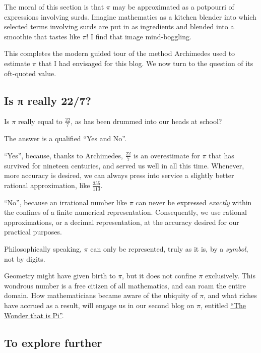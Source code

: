 \documentclass[
  a4paper,
]{article}
\begin{document}
The moral of this section is that \(\pi\) may be approximated as a
potpourri of expressions involving surds. Imagine mathematics as a
kitchen blender into which selected terms involving surds are put in as
ingredients and blended into a smoothie that tastes like \(\pi\)! I find
that image mind-boggling.

This completes the modern guided tour of the method Archimedes used to
estimate \(\pi\) that I had envisaged for this blog. We now turn to the
question of its oft-quoted value.

\subsection{Is π really 22/7?}\label{is-ux3c0-really-227}

Is \(\pi\) really equal to \(\frac{22}{7}\), as has been drummed into
our heads at school?

The answer is a qualified ``Yes and No''.

``Yes'', because, thanks to Archimedes, \(\frac{22}{7}\) is an
overestimate for \(\pi\) that has survived for nineteen centuries, and
served us well in all this time. Whenever, more accuracy is desired, we
can always press into service a slightly better rational approximation,
like
\href{https://en.wikipedia.org/wiki/Mil\%C3\%BC}{\(\frac{355}{113}\)}.

``No'', because an irrational number like \(\pi\) can never be expressed
\emph{exactly} within the confines of a finite numerical representation.
Consequently, we use rational approximations, or a decimal
representation, at the accuracy desired for our practical purposes.

Philosophically speaking, \(\pi\) can only be represented, truly as it
is, by a \emph{symbol}, not by digits.

Geometry might have given birth to \(\pi\), but it does not confine
\(\pi\) exclusively. This wondrous number is a free citizen of all
mathematics, and can roam the entire domain. How mathematicians became
aware of the ubiquity of \(\pi\), and what riches have accrued as a
result, will engage us in our second blog on \(\pi\), entitled
\href{https://swanlotus.netlify.app/blogs/the-wonder-that-is-pi}{``The
Wonder that is Pi''}.

\subsection{To explore further}\label{to-explore-further}
\end{document}
